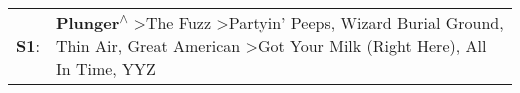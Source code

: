 \begin{supertabular}{p{0.03\textwidth}p{0.92\textwidth}}
 \textbf{S1}:  &  \textbf{Plunger\textsuperscript{$\wedge$}} \textgreater \enspace The Fuzz\textsuperscript{} \textgreater \enspace Partyin' Peeps\textsuperscript{}, \enspace Wizard Burial Ground\textsuperscript{}, \enspace Thin Air\textsuperscript{}, \enspace Great American\textsuperscript{} \textgreater \enspace Got Your Milk (Right Here)\textsuperscript{}, \enspace All In Time\textsuperscript{}, \enspace YYZ\textsuperscript{}  \enspace  \\
\end{supertabular}
